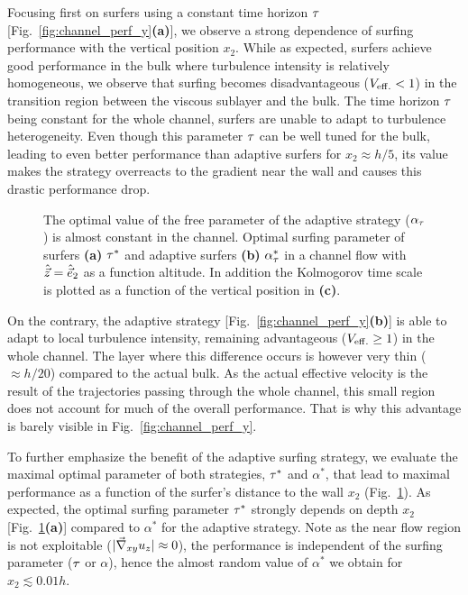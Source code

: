 Focusing first on surfers using a constant time horizon $\tau$ [Fig.~\ref{fig:channel_perf_y}\textbf{(a)}], we observe a strong dependence of surfing performance with the vertical position $x_2$.
While as expected, surfers achieve good performance in the bulk where turbulence intensity is relatively homogeneous, we observe that surfing becomes disadvantageous ($V_{\mathrm{eff.}} < 1$) in the transition region between the viscous sublayer and the bulk.
The time horizon $\tau$ being constant for the whole channel, surfers are unable to adapt to turbulence heterogeneity.
Even though this parameter $\tau$ can be well tuned for the bulk, leading to even better performance than adaptive surfers for $x_2 \approx h/5$, its value makes the strategy overreacts to the gradient near the wall and causes this drastic performance drop.
\begin{figure}
	\centering
	
	\caption[The optimal value of the free parameter of the adaptive strategy ($\alpha_{\TimeHorizon}$) is almost constant in the channel.]{
		The optimal value of the free parameter of the adaptive strategy ($\alpha_{\TimeHorizon}$) is almost constant in the channel.
		Optimal surfing parameter of surfers \textbf{(a)} $\tau^*$ and adaptive surfers \textbf{(b)} $\alpha_{\tau}^*$ in a channel flow with $\hat{\vec{z}} = \hat{\vec{e}}_2$ as a function altitude. 
		In addition the Kolmogorov time scale is plotted as a function of the vertical position in \textbf{(c)}.
	}
	\label{fig:max_channel_binned_velocity_y}
\end{figure}

On the contrary, the adaptive strategy [Fig.~\ref{fig:channel_perf_y}\textbf{(b)}] is able to adapt to local turbulence intensity, remaining advantageous ($V_{\mathrm{eff.}} \ge 1$) in the whole channel.
The layer where this difference occurs is however very thin ($\approx h/20$) compared to the actual bulk.
As the actual effective velocity is the result of the trajectories passing through the whole channel, this small region does not account for much of the overall performance.
That is why this advantage is barely visible in Fig.~\ref{fig:channel_perf_y}.

To further emphasize the benefit of the adaptive surfing strategy, we evaluate the maximal optimal parameter of both strategies, $\tau^*$ and $\alpha^*$, that lead to maximal performance as a function of the surfer's distance to the wall $x_2$ (Fig.~\ref{fig:max_channel_binned_velocity_y}).
As expected, the optimal surfing parameter $\tau^*$ strongly depends on depth $x_2$ [Fig.~\ref{fig:max_channel_binned_velocity_y}\textbf{(a)}] compared to $\alpha^{*}$ for the adaptive strategy.
Note as the near flow region is not exploitable ($\lvert\vec{\nabla}_{xy} u_{z}\rvert \approx 0$), the performance is independent of the surfing parameter ($\tau$ or $\alpha$), hence the almost random value of $\alpha^{*}$ we obtain for $x_2 \lesssim 0.01 h$.

